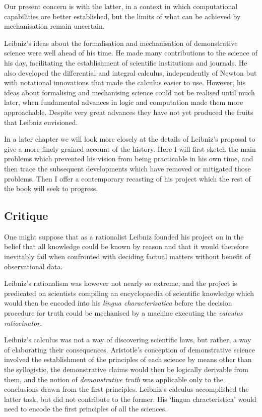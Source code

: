 Our present concern is with the latter, in a context in which computational capabilities are better established, but the limits of what can be achieved by mechanisation remain uncertain.

Leibniz's ideas about the formalisation and mechanisation of demonstrative science were well ahead of his time. He made many contributions to the science of his day, facilitating the establishment of scientific institutions and journals. He also developed the differential and integral calculus, independently of Newton but with notational innovations that made the calculus easier to use. However, his ideas about formalising and mechanising science could not be realised until much later, when fundamental advances in logic and computation made them more approachable. Despite very great advances they have not yet produced the fruits that Leibniz envisioned.

In a later chapter we will look more closely at the details of Leibniz's proposal to give a more finely grained account of the history.
Here I will first sketch the main problems which prevented his vision from being practicable in his own time, and then trace the subsequent developments which have removed or mitigated those problems.
Then I offer a contemporary recasting of his project which the rest of the book will seek to progress.

\subsection{Critique}

One might suppose that as a rationalist Leibniz founded his project on in the belief that all knowledge could be known by reason and that it would therefore inevitably fail when confronted with deciding factual matters without benefit of observational data.

Leibniz's rationalism was however not nearly so extreme, and the project is predicated on scientists compiling an encyclopaedia of scientific knowledge which would then be encoded into his \emph{lingua characterisatica} before the decision procedure for truth could be mechanised by a machine executing the \emph{calculus ratiocinator}.

Leibniz's calculus was not a way of discovering scientific laws, but rather, a way of elaborating their consequences.
Aristotle's conception of demonstrative science involved the establishment of the principles of each science by means other than the syllogistic, the demonstrative claims would then be logically derivable from them, and the notion of \emph{demonstrative truth} was applicable only to the conclusions drawn from the first principles.
Leibniz's calculus accomplished the latter task, but did not contribute to the former.
His `lingua chracteristica' would need to encode the first principles of all the sciences.

